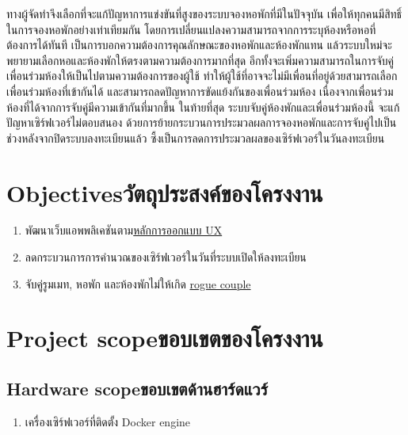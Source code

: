 ทางผู้จัดทำจึงเลือกที่จะแก้ปัญหาการแข่งขันที่สูงของระบบจองหอพักที่มีในปัจจุบัน เพื่อให้ทุกคนมีสิทธิ์ในการจองหอพักอย่างเท่าเทียมกัน
โดยการเปลี่ยนแปลงความสามารถจากการระบุห้องหรือหอที่ต้องการได้ทันที เป็นการบอกความต้องการคุณลักษณะของหอพักและห้องพักแทน
แล้วระบบใหม่จะพยายามเลือกหอและห้องพักให้ตรงตามความต้องการมากที่สุด อีกทั้งจะเพิ่มความสามารถในการจับคู่เพื่อนร่วมห้องให้เป็นไปตามความต้องการของผู้ใช้ ทำให้ผู้ใช้ที่อาจจะไม่มีเพื่อนที่อยู่ด้วยสามารถเลือกเพื่อนร่วมห้องที่เข้ากันได้
และสามารถลดปัญหาการขัดแย้งกันของเพื่อนร่วมห้อง เนื่องจากเพื่อนร่วมห้องที่ได้จากการจับคู่มีความเข้ากันที่มากขึ้น
ในท้ายที่สุด ระบบจับคู่ห้องพักและเพื่อนร่วมห้องนี้ จะแก้ปัญหาเซิร์ฟเวอร์ไม่ตอบสนอง ด้วยการย้ายกระบวนการประมวลผลการจองหอพักและการจับคู่ไปเป็นช่วงหลังจากปิดระบบลงทะเบียนแล้ว
ซึ้งเป็นการลดการประมวลผลของเซิร์ฟเวอร์ในวันลงทะเบียน

\section{\ifenglish Objectives\else วัตถุประสงค์ของโครงงาน\fi}
\begin{enumerate}
    \item พัฒนาเว็บแอพพลิเคชันตาม\hyperref[subsec:uxlaws]{หลักการออกแบบ UX}
    \item ลดกระบวนการการคำนวณของเซิร์ฟเวอร์ในวันที่ระบบเปิดให้ลงทะเบียน
    \item จับคู่รูมเมท, หอพัก และห้องพักไม่ให้เกิด \hyperref[sec:rmp]{rogue couple}
\end{enumerate}

\section{\ifenglish Project scope\else ขอบเขตของโครงงาน\fi}
\subsection{\ifenglish Hardware scope\else ขอบเขตด้านฮาร์ดแวร์\fi}
\begin{enumerate}
    \item เครื่องเซิร์ฟเวอร์ที่ติดตั้ง Docker engine
\end{enumerate}
